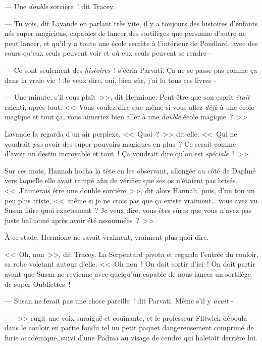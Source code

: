 --- Une \emph{double} sorcière~! dit Tracey.

--- Tu vois, dit Lavande en parlant très vite, il y a toujours des histoires d'enfants nés super magiciens, capables de lancer des sortilèges que personne d'autre ne peut lancer, et qu'il y a toute une école secrète à l'intérieur de Poudlard, avec des cours qu'eux seuls peuvent voir et où eux seuls peuvent se rendre -

--- Ce sont seulement des \emph{histoires}~! s'écria Parvati. Ça ne se passe pas comme ça dans la vraie vie~! Je veux dire, oui, bien sûr, j'ai lu tous ces livres -

--- Une minute, s'il vous plaît~>>, dit Hermione. Peut-être que son esprit \emph{était} ralenti, après tout. <<~Vous voulez dire que même si vous allez \emph{déjà} à une école magique et tout ça, vous aimeriez bien aller à une \emph{double} école magique~?~>>

Lavande la regarda d'un air perplexe. <<~Quoi~?~>> dit-elle. <<~Qui ne voudrait \emph{pas} avoir des super pouvoirs magiques en plus~? Ce serait comme d'avoir un destin incroyable et tout~! Ça voudrait dire qu'on est \emph{spéciale}~!~>>

Sur ces mots, Hannah hocha la tête en les observant, allongée au côté de Daphné vers laquelle elle avait rampé afin de vérifier que ses os n'étaient pas brisés. <<~J'aimerais être une double sorcière~>>, dit alors Hannah, puis, d'un ton un peu plus triste, <<~même si je ne crois pas que ça existe vraiment… vous avez vu Susan faire quoi exactement~? Je veux dire, vous êtes sûres que vous n'avez pas juste halluciné après avoir été assommées~?~>>

À ce stade, Hermione ne savait vraiment, vraiment plus quoi dire.

<<~Oh, non~>>, dit Tracey. La Serpentard pivota et regarda l'entrée du couloir, sa robe voletant autour d'elle. <<~Oh non~! On doit sortir d'ici~! On doit partir avant que Susan ne revienne avec quelqu'un capable de nous lancer un sortilège de super-Oubliettes~!

--- Susan ne ferait pas une chose pareille~! dit Parvati. Même s'il y \emph{avait} -

--- ~>> rugit une voix suraiguë et couinante, et le professeur Flitwick déboula dans le couloir en partie fondu tel un petit paquet dangereusement comprimé de furie académique, suivi d'une Padma au visage de cendre qui haletait derrière lui.

\later

